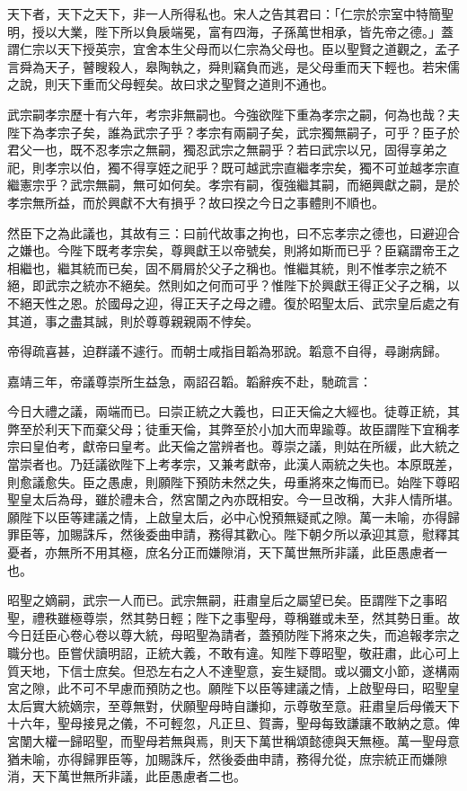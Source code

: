 \begin{pinyinscope}
天下者，天下之天下，非一人所得私也。宋人之告其君曰：「仁宗於宗室中特簡聖明，授以大業，陛下所以負扆端冕，富有四海，子孫萬世相承，皆先帝之德。」蓋謂仁宗以天下授英宗，宜舍本生父母而以仁宗為父母也。臣以聖賢之道觀之，孟子言舜為天子，瞽瞍殺人，皋陶執之，舜則竊負而逃，是父母重而天下輕也。若宋儒之說，則天下重而父母輕矣。故曰求之聖賢之道則不通也。

武宗嗣孝宗歷十有六年，考宗非無嗣也。今強欲陛下重為孝宗之嗣，何為也哉？夫陛下為孝宗子矣，誰為武宗子乎？孝宗有兩嗣子矣，武宗獨無嗣子，可乎？臣子於君父一也，既不忍孝宗之無嗣，獨忍武宗之無嗣乎？若曰武宗以兄，固得享弟之祀，則孝宗以伯，獨不得享姪之祀乎？既可越武宗直繼孝宗矣，獨不可並越孝宗直繼憲宗乎？武宗無嗣，無可如何矣。孝宗有嗣，復強繼其嗣，而絕興獻之嗣，是於孝宗無所益，而於興獻不大有損乎？故曰揆之今日之事體則不順也。

然臣下之為此議也，其故有三：曰前代故事之拘也，曰不忘孝宗之德也，曰避迎合之嫌也。今陛下既考孝宗矣，尊興獻王以帝號矣，則將如斯而已乎？臣竊謂帝王之相繼也，繼其統而已矣，固不屑屑於父子之稱也。惟繼其統，則不惟孝宗之統不絕，即武宗之統亦不絕矣。然則如之何而可乎？惟陛下於興獻王得正父子之稱，以不絕天性之恩。於國母之迎，得正天子之母之禮。復於昭聖太后、武宗皇后處之有其道，事之盡其誠，則於尊尊親親兩不悖矣。

帝得疏喜甚，迫群議不遽行。而朝士咸指目韜為邪說。韜意不自得，尋謝病歸。

嘉靖三年，帝議尊崇所生益急，兩詔召韜。韜辭疾不赴，馳疏言：

今日大禮之議，兩端而已。曰崇正統之大義也，曰正天倫之大經也。徒尊正統，其弊至於利天下而棄父母；徒重天倫，其弊至於小加大而卑踰尊。故臣謂陛下宜稱孝宗曰皇伯考，獻帝曰皇考。此天倫之當辨者也。尊崇之議，則姑在所緩，此大統之當崇者也。乃廷議欲陛下上考孝宗，又兼考獻帝，此漢人兩統之失也。本原既差，則愈議愈失。臣之愚慮，則願陛下預防未然之失，毋重將來之悔而已。始陛下尊昭聖皇太后為母，雖於禮未合，然宮闈之內亦既相安。今一旦改稱，大非人情所堪。願陛下以臣等建議之情，上啟皇太后，必中心悅預無疑貳之隙。萬一未喻，亦得歸罪臣等，加賜誅斥，然後委曲申請，務得其歡心。陛下朝夕所以承迎其意，慰釋其憂者，亦無所不用其極，庶名分正而嫌隙消，天下萬世無所非議，此臣愚慮者一也。

昭聖之嫡嗣，武宗一人而已。武宗無嗣，莊肅皇后之屬望已矣。臣謂陛下之事昭聖，禮秩雖極尊崇，然其勢日輕；陛下之事聖母，尊稱雖或未至，然其勢日重。故今日廷臣心卷心卷以尊大統，母昭聖為請者，蓋預防陛下將來之失，而追報孝宗之職分也。臣嘗伏讀明詔，正統大義，不敢有違。知陛下尊昭聖，敬莊肅，此心可上質天地，下信士庶矣。但恐左右之人不達聖意，妄生疑間。或以彌文小節，遂構兩宮之隙，此不可不早慮而預防之也。願陛下以臣等建議之情，上啟聖母曰，昭聖皇太后實大統嫡宗，至尊無對，伏願聖母時自謙抑，示尊敬至意。莊肅皇后母儀天下十六年，聖母接見之儀，不可輕忽，凡正旦、賀壽，聖母每致謙讓不敢納之意。俾宮闈大權一歸昭聖，而聖母若無與焉，則天下萬世稱頌懿德與天無極。萬一聖母意猶未喻，亦得歸罪臣等，加賜誅斥，然後委曲申請，務得允從，庶宗統正而嫌隙消，天下萬世無所非議，此臣愚慮者二也。


\end{pinyinscope}
